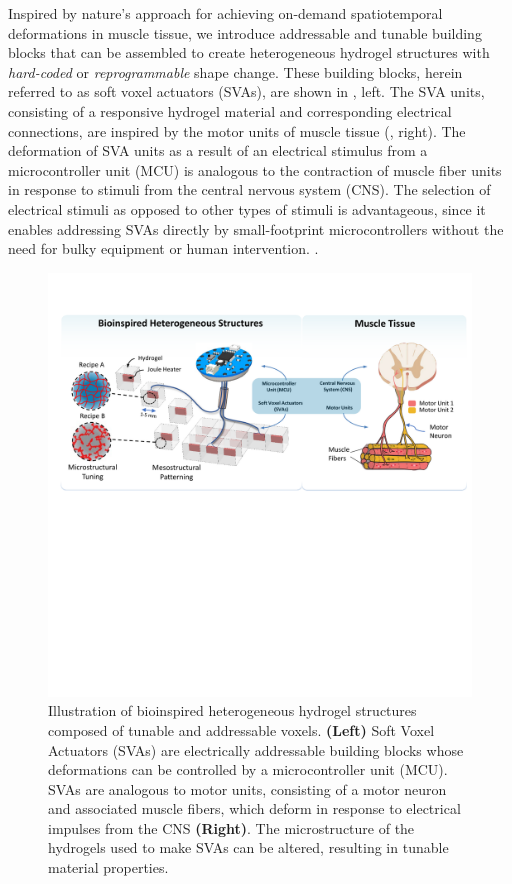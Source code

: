 Inspired by nature's approach for achieving on-demand spatiotemporal deformations in muscle tissue, we introduce addressable and tunable building blocks that can be assembled to create heterogeneous hydrogel structures with \textit{hard-coded} or \textit{reprogrammable} shape change. These building blocks, herein referred to as soft voxel actuators (SVAs), are shown in , left. The SVA units, consisting of a responsive hydrogel material and corresponding electrical connections, are inspired by the motor units of muscle tissue (, right).
The deformation of SVA units as a result of an electrical stimulus from a microcontroller unit (MCU) is analogous to the contraction of muscle fiber units in response to stimuli from the central nervous system (CNS).
The selection of electrical stimuli as opposed to other types of stimuli is advantageous, since it enables addressing SVAs directly by small-footprint microcontrollers without the need for bulky equipment or human intervention. .\\
\begin{figure}[!ht]
\centering
\includegraphics[width=\textwidth]{analogy.pdf}
\caption[]{Illustration of bioinspired heterogeneous hydrogel structures composed of tunable and addressable voxels. \textbf{(Left)} Soft Voxel Actuators (SVAs) are electrically addressable building blocks whose deformations can be controlled by a microcontroller unit (MCU). SVAs are analogous to motor units, consisting of a motor neuron and associated muscle fibers, which deform in response to electrical impulses from the CNS \textbf{(Right)}. The microstructure of the hydrogels used to make SVAs can be altered, resulting in tunable material properties.}
\label{fig:analogy}
\end{figure}

